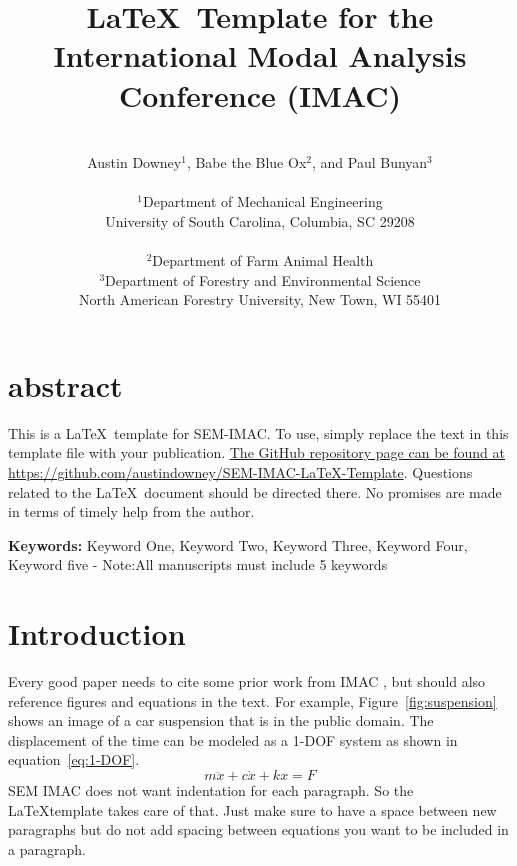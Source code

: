 \documentclass[10pt,letterpaper]{article}
\newcommand{\keywords}[1]{\vspace{2ex} \noindent \textbf{Keywords:} #1}
\begin{document}
	\date{} %
	
	\title{\LaTeX\  Template for the International Modal Analysis Conference (IMAC)}
	
	\author{\vspace{.25in}\\
	Austin Downey$^1$, Babe the Blue Ox$^2$, and Paul Bunyan$^3$\\ \\ %
	 $^1$Department of Mechanical Engineering \\
		University of South Carolina, Columbia, SC 29208 \\ \\ %
	 $^2$Department of Farm Animal Health \\
	 $^3$Department of Forestry and Environmental Science \\
		North American Forestry University, New Town, WI 55401 \\
	}
	\maketitle
	
	\section{abstract}
		This is a \LaTeX\ template for SEM-IMAC. To use, simply replace the text in this template file with your publication. \href{https://github.com/austindowney/SEM-IMAC-LaTeX-Template}{The GitHub repository page can be found at https://github.com/austindowney/SEM-IMAC-LaTeX-Template}. Questions related to the \LaTeX\ document should be directed there. No promises are made in terms of timely help from the author.
	
	\keywords{Keyword One, Keyword Two, Keyword Three, Keyword Four, Keyword five - Note:All manuscripts must include 5 keywords}
	
	\section{Introduction}
	
		Every good paper needs to cite some prior work from IMAC \cite{Downey2021OpenVibrations,Ishrat2019RealtimeForecasting,Downey2020Millisecondmodelupdating,Downey2016HighCapacityVariable}, but should also reference figures and equations in the text. For example, Figure~\ref{fig:suspension} shows an image of a car suspension that is in the public domain. The displacement of the time can be modeled as a 1-DOF system as shown in equation~\ref{eq:1-DOF}.
		\begin{equation}
		m\ddot{x} + c\dot{x} + kx = F
		\label{eq:1-DOF}
		\end{equation}
		SEM IMAC does not want indentation for each paragraph. So the \LaTeX template takes care of that. Just make sure to have a space between new paragraphs but do not add spacing between equations you want to be included in a paragraph. 
		
\end{document}
